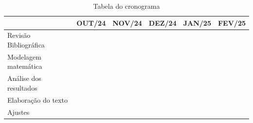 \documentclass[
	12pt,				%
	openright,			%
	a4paper,			%
	english,			%
	french,				%
	spanish,			%
	brazil				%
	]{article}
\begin{document}
\begin{table}[H]
\begin{tabular}{llllll}
\hline
                        & OUT/24                                          & NOV/24                                          & DEZ/24                                          & JAN/25                                          & FEV/25                   \\ \hline
Revisão Bibliográfica & \cellcolor[HTML]{656565}{\color[HTML]{333333} } & \cellcolor[HTML]{656565}{\color[HTML]{333333} } & \cellcolor[HTML]{656565}{\color[HTML]{333333} } & \cellcolor[HTML]{656565}{\color[HTML]{333333} } & \cellcolor[HTML]{656565} \\ \hline
Modelagem matemática    &                                                 & \cellcolor[HTML]{656565}{\color[HTML]{333333} } & \cellcolor[HTML]{656565}                        &                                                 &                          \\ \hline
Análise dos resultados  &                                                 & \cellcolor[HTML]{656565}{\color[HTML]{333333} } & \cellcolor[HTML]{656565}{\color[HTML]{333333} } & \cellcolor[HTML]{656565}                        &                          \\ \hline
Elaboração do texto     &                                                 &                                                 & \cellcolor[HTML]{656565}{\color[HTML]{333333} } & \cellcolor[HTML]{656565}{\color[HTML]{333333} } & \cellcolor[HTML]{656565} \\ \hline
Ajustes                 &                                                 &                                                 &                                                 &                                                 & \cellcolor[HTML]{656565} \\ \hline
\end{tabular}
\caption{Tabela do cronograma}
\label{table:1}
\end{table}

\printbibliography
\end{document}
